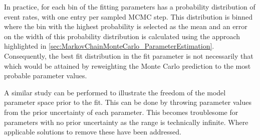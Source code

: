 In practice, for each bin of the fitting parameters has a probability distribution of event rates, with one entry per sampled MCMC step. This distribution is binned where the bin with the highest probability is selected as the mean and an error on the width of this probability distribution is calculated using the approach highlighted in \autoref{sec:MarkovChainMonteCarlo_ParameterEstimation}. Consequently, the best fit distribution in the fit parameter is not necessarily that which would be attained by reweighting the Monte Carlo prediction to the most probable parameter values.

A similar study can be performed to illustrate the freedom of the model parameter space prior to the fit. This can be done by throwing parameter values from the prior uncertainty of each parameter. This becomes troublesome for parameters with no prior uncertainty as the range is technically infinite. Where applicable solutions to remove these have been addressed.
